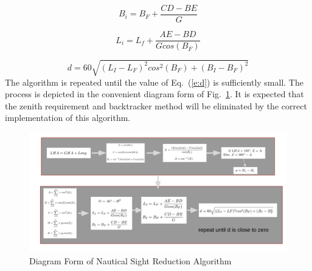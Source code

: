 \documentclass[12pt,a4paper]{book}
\begin{document}
\begin{equation}
 \label{e:Bi}
    B_{i} = B_{F} + \frac{CD-BE}{G}
\end{equation}

\begin{equation}
 \label{e:Li}
    L_{i} = L_{f} + \frac{AE - BD}{Gcos(B_{F})}
\end{equation}

\begin{equation}
 \label{e:d}
    d = 60\sqrt{(L_{I} - L_{F})^{2}cos^{2}(B_{F}) + (B_{I} - B_{F})^{2}}
\end{equation}
The algorithm is repeated until the value of Eq.~(\ref{e:d}) is sufficiently small.  The process is depicted in the convenient diagram form of Fig.~\ref{f:nsrBlocks}.  It is expected that the zenith requirement and backtracker method will be eliminated by the correct implementation of this algorithm.
\begin{figure}[h!]
\centering
\includegraphics[scale=0.35]{nsrBlocks.png}
\caption{Diagram Form of Nautical Sight Reduction Algorithm}
\label{f:nsrBlocks} 
\end{figure}
\end{document}
